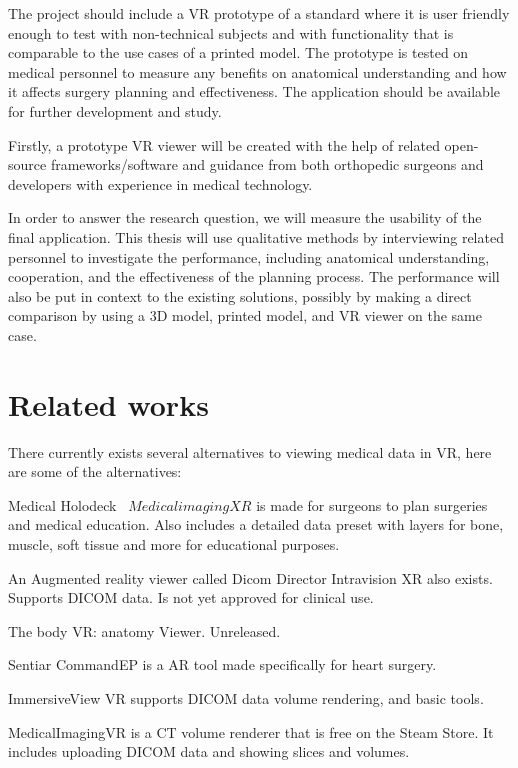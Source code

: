 \documentclass[a4paper]{report}
\begin{document}
The project should include a VR prototype of a standard where it is
user friendly enough to test with non-technical subjects and with functionality
that is comparable to the use cases of a printed model.
The prototype is tested on medical personnel to measure any benefits on anatomical understanding and how it affects surgery planning and effectiveness.
The application should be available for further development and study.

Firstly, a prototype VR viewer will be created with the help of related
open-source frameworks/software and guidance from both orthopedic surgeons and
developers with experience in medical technology.

In order to answer the research question, we will measure the
usability of the final application. This thesis will use qualitative methods
by interviewing related personnel to investigate the performance, including
anatomical understanding, cooperation, and the effectiveness of the planning
process.
The performance will also be put in context to the existing solutions, possibly
by making a direct comparison by using a 3D model, printed model, and VR viewer
on the same case.

\section{Related works}

There currently exists several alternatives to viewing medical data in VR, here are some of the alternatives:

Medical Holodeck~\cite{medical_holodeck_medicalholodeck_nodate} $Medical imaging XR$ is made for surgeons to plan surgeries and medical education. Also includes a detailed data preset with layers for bone, muscle, soft tissue and more for educational purposes.

An Augmented reality viewer called Dicom Director Intravision XR also exists. Supports DICOM data. Is not yet approved for clinical use.\cite{dicomdirectorcom_surgeons_nodate}

The body VR: anatomy Viewer\cite{the body}. Unreleased.

Sentiar CommandEP is a AR tool made specifically for heart surgery. 

ImmersiveView VR supports DICOM data volume rendering, and basic tools\cite{immersive}.

MedicalImagingVR is a CT volume renderer that is free on the Steam Store\cite{}. It includes uploading DICOM data and showing slices and volumes.
\end{document}
